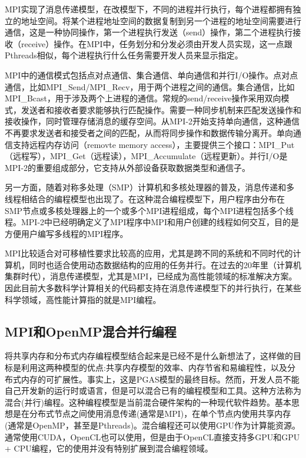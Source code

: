 MPI实现了消息传递模型\citep{gropp1999using}，在改模型下，不同的进程并行执行，每个进程都拥有独立的地址空间。将某个进程地址空间的数据复制到另一个进程的地址空间需要进行通信，这是一种协同操作，第一个进程执行发送（send）操作，第二个进程执行接收（receive）操作。在MPI中，任务划分和分发必须由开发人员实现，这一点跟Pthreads相似，每个进程执行什么任务需要开发人员来显示指定。  

MPI中的通信模式包括点对点通信、集合通信、单向通信和并行I/O操作。点对点通信，比如MPI\_Send/MPI\_Recv，用于两个进程之间的通信。集合通信，比如MPI\_Bcast，用于涉及两个上进程的通信。常规的send/receive操作采用双向模式，发送者和接收者要求能够执行匹配操作。需要一种同步机制来匹配发送操作和接收操作，同时管理存储消息的缓存空间。从MPI-2\citep{mpi2003mpi2}开始支持单向通信，这种通信不再要求发送者和接受者之间的匹配，从而将同步操作和数据传输分离开。单向通信支持远程内存访问（removte memory access），主要提供三个接口：MPI\_Put（远程写），MPI\_Get（远程读），MPI\_Accumulate（远程更新）。并行I/O是MPI-2的重要组成部分，它支持从外部设备获取数据类型和通信子\citep{gropp1999using}。  

另一方面，随着对称多处理（SMP）计算机和多核处理器的普及，消息传递和多线程相结合的编程模型也出现了。在这种混合编程模型下，用户程序由分布在SMP节点或多核处理器上的一个或多个MPI进程组成，每个MPI进程包括多个线程。MPI-2中已经明确定义了MPI程序中MPI和用户创建的线程如何交互，目的是方便用户编写多线程的MPI程序。  

MPI比较适合对可移植性要求比较高的应用，尤其是跨不同的系统和不同时代的计算机，同时也适合使用动态数据结构的应用的任务并行。在过去的20年里（计算机集群时代），消息传递模型，尤其是MPI，已经成为高性能领域的标准解决方案。因此目前大多数科学计算相关的代码都支持在消息传递模型下的并行执行，在某些科学领域，高性能计算指的就是MPI编程。


\subsection{MPI和OpenMP混合并行编程}

将共享内存和分布式内存编程模型结合起来是已经不是什么新想法了\citep{sterling1995enabling}，这样做的目标是利用这两种模型的优点:共享内存模型的效率、内存节省和易编程性，以及分布式内存的可扩展性。事实上，这是PGAS模型的最终目标。然而，开发人员不能自己开发新的运行时或语言，但是可以混合已有的编程模型和工具。这种方法称为混合(并行)编程。这种编程模型是当前混合硬件架构的一种现代软件趋势。基本思想是在分布式节点之间使用消息传递(通常是MPI)，在单个节点内使用共享内存(通常是OpenMP，甚至是Pthreads)。混合编程还可以使用GPU作为计算能资源。通常使用CUDA，OpenCL也可以使用，但是由于OpenCL直接支持多GPU和GPU + CPU编程，它的使用并没有特别扩展到混合编程领域。

